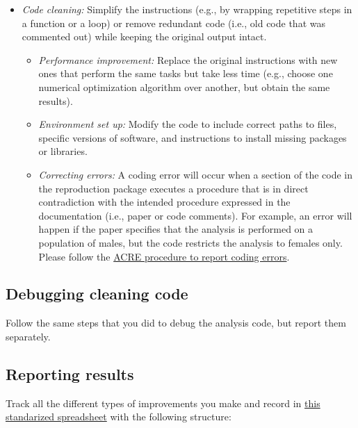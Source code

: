 \documentclass[]{book}
\providecommand{\tightlist}{%
  \setlength{\itemsep}{0pt}\setlength{\parskip}{0pt}}
\begin{document}
\begin{itemize}
\tightlist
\item
  \emph{Code cleaning:} Simplify the instructions (e.g., by wrapping repetitive steps in a function or a loop) or remove redundant code (i.e., old code that was commented out) while keeping the original output intact.

  \begin{itemize}
  \tightlist
  \item
    \emph{Performance improvement:} Replace the original instructions with new ones that perform the same tasks but take less time (e.g., choose one numerical optimization algorithm over another, but obtain the same results).\\
  \item
    \emph{Environment set up:} Modify the code to include correct paths to files, specific versions of software, and instructions to install missing packages or libraries.\\
  \item
    \emph{Correcting errors:} A coding error will occur when a section of the code in the reproduction package executes a procedure that is in direct contradiction with the intended procedure expressed in the documentation (i.e., paper or code comments). For example, an error will happen if the paper specifies that the analysis is performed on a population of males, but the code restricts the analysis to females only. Please follow the \href{ADD\%20LINK}{ACRE procedure to report coding errors}.
  \end{itemize}
\end{itemize}

\hypertarget{debugging-cleaning-code}{%
\subsection{Debugging cleaning code}\label{debugging-cleaning-code}}

Follow the same steps that you did to debug the analysis code, but report them separately.

\hypertarget{reporting-results}{%
\subsection{Reporting results}\label{reporting-results}}

Track all the different types of improvements you make and record in \href{https://docs.google.com/spreadsheets/d/1LUIdVFH0OfR70C7z07TYeE-uWzKI_JIeWUMaYhqEKK0/edit\#gid=0\&range=A3}{this standarized spreadsheet} with the following structure:
\end{document}
